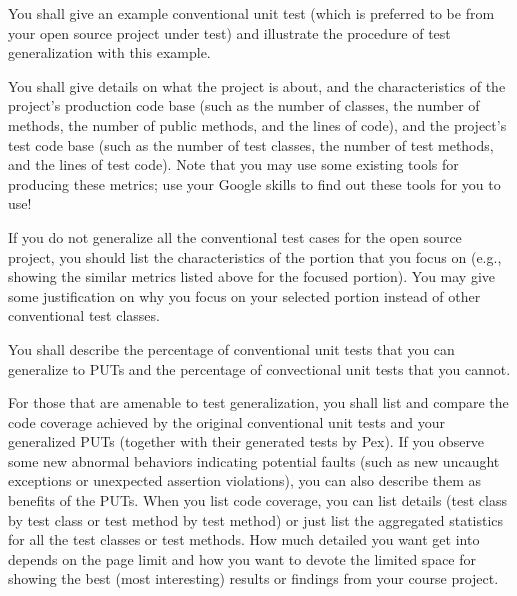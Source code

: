 \documentclass[times, 10pt,twocolumn]{article}
\begin{document}
You shall give an example conventional unit test (which is preferred
to be from your open source project under test) and illustrate the
procedure of test generalization with this example.

 \label{sec:subject}

You shall give details on what the project is about, and the
characteristics of the project's production code base (such as the
number of classes, the number of methods, the number of public
methods, and the lines of code), and the project's test code base
(such as the number of test classes, the number of test methods, and
the lines of test code). Note that you may use some existing tools
for producing these metrics; use your Google skills to find out
these tools for you to use!

If you do not generalize all the conventional test cases for the
open source project, you should list the characteristics of the
portion that you focus on (e.g., showing the similar metrics listed
above for the focused portion). You may give some justification on
why you focus on your selected portion instead of other conventional
test classes.

 \label{sec:benefits}

You shall describe the percentage of conventional unit tests that
you can generalize to PUTs and the percentage of convectional unit
tests that you cannot.

For those that are amenable to test generalization, you shall list
and compare the code coverage achieved by the original conventional
unit tests and your generalized PUTs (together with their generated
tests by Pex). If you observe some new abnormal behaviors indicating
potential faults (such as new uncaught exceptions or unexpected
assertion violations), you can also describe them as benefits of the
PUTs. When you list code coverage, you can list details (test class
by test class or test method by test method) or just list the
aggregated statistics for all the test classes or test methods. How
much detailed you want get into depends on the page limit and how
you want to devote the limited space for showing the best (most
interesting) results or findings from your course project.

\end{document}
